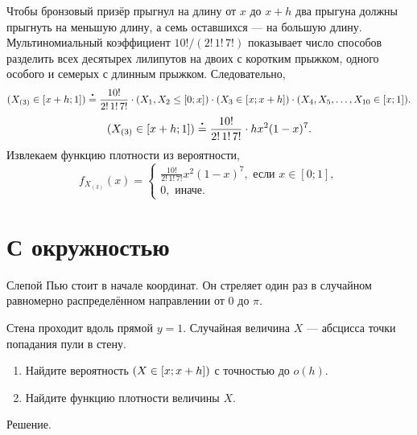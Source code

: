 \documentclass[12pt]{article}
\let\P\relax
\DeclareMathOperator{\P}{\mathbb{P}}
\newcommand\vardot[1][.4]{\mathbin{\vcenter{\hbox{\scalebox{#1}{$\bullet$}}}}}
\newcommand{\ulteq}{\mathrel{\overset{\vardot}{=}}}
\begin{document}
Чтобы бронзовый призёр прыгнул на длину от $x$ до $x+h$ два прыгуна должны прыгнуть на меньшую длину, а семь оставшихся — на большую длину.
Мультиномиальный коэффициент $10!/(2! \, 1! \, 7!)$ показывает число способов разделить всех десятырех лилипутов на двоих с коротким прыжком, одного особого и семерых с длинным прыжком.
Следовательно,
\[
\P(X_{(3)} \in [x+h; 1]) \ulteq \frac{10!}{2! \, 1! \, 7!} \cdot \P(X_1, X_2 \leq [0; x]) \cdot \P(X_3 \in [x; x+h]) \cdot \P(X_4, X_5, \dots, X_{10} \in [x; 1]). 
\]
\[
\P(X_{(3)} \in [x+h; 1]) \ulteq \frac{10!}{2! \, 1! \, 7!} \cdot  h x^2 (1 - x)^7.
\]
Извлекаем функцию плотности из вероятности,
\[
f_{X_{(3)}}(x) = \begin{cases}
  \frac{10!}{2! \, 1! \, 7!} x^2 (1 - x)^7, \text{ если } x \in [0;1], \\
  0, \text{ иначе.} 
\end{cases}
\]



\section*{С окружностью}

Слепой Пью стоит в начале координат. 
Он стреляет один раз в случайном равномерно распределённом направлении от $0$ до $\pi$.

Стена проходит вдоль прямой $y = 1$.
Случайная величина $X$ — абсцисса точки попадания пули в стену. 

\begin{enumerate}
    \item Найдите вероятность $\P(X \in [x; x+ h])$ с точностью до $o(h)$.
    \item Найдите функцию плотности величины $X$. 
\end{enumerate}


Решение.
\end{document}

